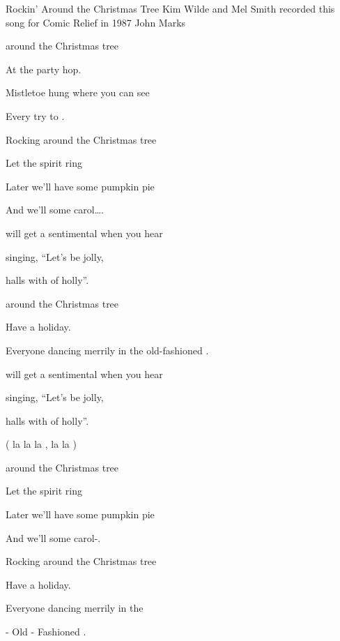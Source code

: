 \begin{SBSong}{Rockin' Around the Christmas Tree}
    {Kim Wilde and Mel Smith recorded this song for Comic Relief in 1987}
    {John Marks}
  \begin{SBVerse}
     around the Christmas tree
    
    At the  party hop.
    
    Mistletoe hung where you can see
    
    Every  try to .
    
    Rocking around the Christmas tree
    
    Let the  spirit ring
    
    Later we'll have some pumpkin pie
    
    And we'll  some carol\ldots{}.
  \end{SBVerse}
  \begin{SBVerse}
     will get a sentimental  when you hear
    
     singing, ``Let's be jolly,
    
      halls with  of holly''.
    
     around the Christmas tree
    
    Have a  holiday.
    
    Everyone dancing merrily in the
     old-fashioned .
  \end{SBVerse}
  
  \begin{SBVerse}
     will get a sentimental  when you hear
    
     singing, ``Let's be jolly,
    
      halls with  of holly''.
    
    ( la la la , la la  )
  \end{SBVerse}
  \begin{SBVerse}
     around the Christmas tree
    
    Let the  spirit ring
    
    Later we'll have some pumpkin pie
    
    And we'll  some carol-.
    
    Rocking around the Christmas tree
    
    Have a  holiday.
    
    Everyone dancing merrily in the
    
     - Old - Fashioned .  
  \end{SBVerse}
\end{SBSong}
